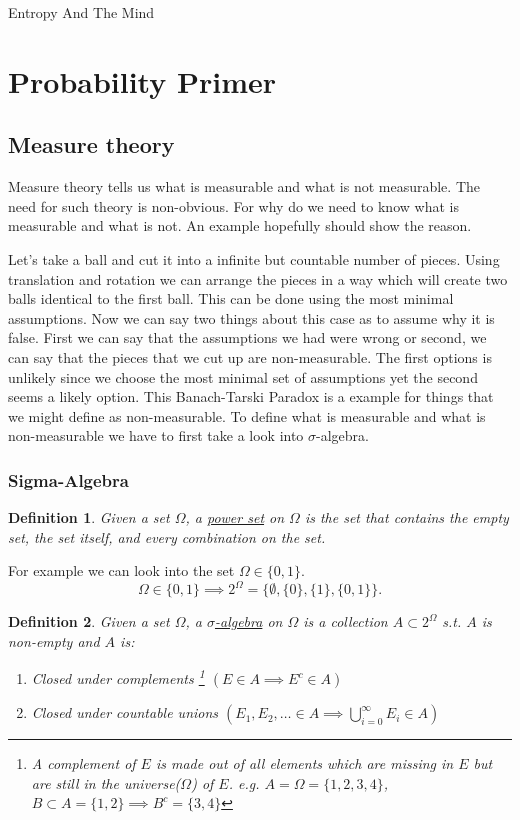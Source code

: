 \documentclass{article}
\newtheorem{definition}{Definition}
\begin{document}
\begin{center}
\Huge Entropy And The Mind 
\end{center}

\tableofcontents

\section{Probability Primer}
\subsection{Measure theory} 
Measure theory tells us what is measurable and what is not measurable. The 
need for such theory is non-obvious. For why do we need to know what is 
measurable and what is not. An example hopefully should show the reason. 

Let's take a ball and cut it into a infinite but countable number of pieces. 
Using translation and rotation we can arrange the pieces in a way which will
create two balls identical to the first ball. This can be done using the most
minimal assumptions. Now we can say two things about this case as to assume 
why it is false. First we can say that the assumptions we had were wrong or 
second, we can say that the pieces that we cut up are non-measurable. 
The first options is unlikely since we choose the most minimal set of assumptions
yet the second seems a likely option. This Banach-Tarski Paradox is a example
for things that we might define as non-measurable. To define what is measurable 
and what is non-measurable we have to first take a look into $\sigma$-algebra. 

\subsubsection{Sigma-Algebra}

\begin{definition}
    \label{def:power-set}
    Given a set $\Omega$, a \underline{power set} on $\Omega$ is the set that 
    contains the empty set, the set itself, and every combination on the set. 
\end{definition}
For example we can look into the set $\Omega \in \{0, 1\}$.
\[
    \Omega \in \{0, 1\} \implies 2^{\Omega} = \{\emptyset,  \{0\},  \{1\},  \{0, 1\}\}
.\] 

\begin{definition}
    \label{def:sigma-algebra}
    Given a set $\Omega$, a \underline{$\sigma$-algebra} on $\Omega$ is a collection $A \subset 2^{\Omega}$ s.t. $A$ is non-empty and $A$ is:
    \begin{enumerate}
        \item Closed under complements \footnote{A complement of $E$ is made out of all elements which are missing in $E$ but are still in the universe($\Omega$) of $E$. e.g. $A = \Omega = \{1, 2, 3, 4\}$, $B \subset A = \{ 1, 2\} \implies B^c = \{ 3, 4\}$} 
            $\left( E \in A \implies E^c \in A \right) $
        \item Closed under countable unions $(E_1, E_2, \dots \in A \implies \bigcup_{i=0}^{\infty} E_i \in A )$
    \end{enumerate}
\end{definition}
\end{document}
